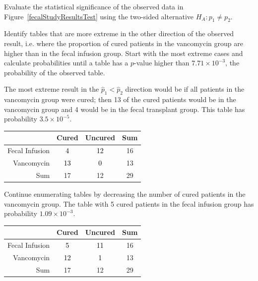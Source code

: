 \begin{examplewrap}
\begin{nexample}{Evaluate the statistical significance of the observed data in Figure~\ref{fecalStudyResultsTest} using the two-sided alternative $H_A: p_1 \neq p_2$.}
	
Identify tables that are more extreme in the other direction of the observed result, i.e. where the proportion of cured patients in the vancomycin group are higher than in the fecal infusion group. Start with the most extreme cases and calculate probabilities until a table has a $p$-value higher than $7.71 \times 10^{-3}$, the probability of the observed table. 

The most extreme result in the $\hat{p}_1 < \hat{p}_2$ direction would be if all patients in the vancomycin group were cured; then 13 of the cured patients would be in the vancomycin group and 4 would be in the fecal transplant group. This table has probability $3.5 \times 10^{-5}$.

\begin{center}
	\color{gray}
	\begin{tabular}{r|cc|c}
		\hline
		& Cured & Uncured & Sum \\ 
		\hline
		Fecal Infusion & \textcolor{black}{4} & \textcolor{black}{12} & 16 \\ 
		Vancomycin & \textcolor{black}{13} & \textcolor{black}{0} & 13 \\ 
		\hline
		Sum & 17 & 12 & 29 \\ 
		\hline
	\end{tabular}
\end{center}

Continue enumerating tables by decreasing the number of cured patients in the vancomycin group. The table with 5 cured patients in the fecal infusion group has probability $1.09 \times 10^{-3}$.

\begin{center}
	\color{gray}
	\begin{tabular}{r|cc|c}
		\hline
		& Cured & Uncured & Sum \\ 
		\hline
		Fecal Infusion & \textcolor{black}{5} & \textcolor{black}{11} & 16 \\ 
		Vancomycin & \textcolor{black}{12} & \textcolor{black}{1} & 13 \\ 
		\hline
		Sum & 17 & 12 & 29 \\ 
		\hline
	\end{tabular}
\end{center}


\end{nexample}
\end{examplewrap}
